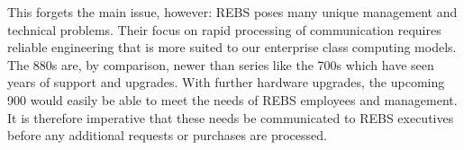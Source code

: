 \documentclass{article}
\begin{document}
\begin{multicols}{2}
This forgets the main issue, however: REBS poses many unique management and technical problems. Their focus on rapid processing of communication requires reliable engineering that is more suited to our enterprise class computing models. The 880s are, by comparison, newer than series like the 700s which have seen years of support and upgrades. With further hardware upgrades, the upcoming 900 would easily be able to meet the needs of REBS employees and management. It is therefore imperative that these needs be communicated to REBS executives before any additional requests or purchases are processed.
\end{multicols}
\end{document}
